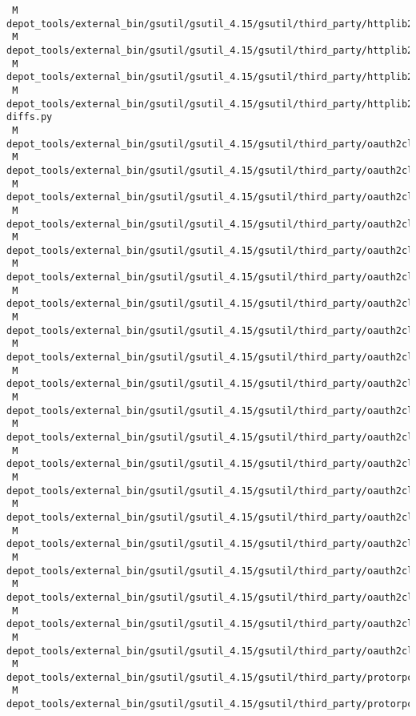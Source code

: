\documentclass{article}
\begin{document}
\begin{verbatim}
 M depot_tools/external_bin/gsutil/gsutil_4.15/gsutil/third_party/httplib2/python2/httplib2test_appengine.py
 M depot_tools/external_bin/gsutil/gsutil_4.15/gsutil/third_party/httplib2/python3/httplib2/__init__.py
 M depot_tools/external_bin/gsutil/gsutil_4.15/gsutil/third_party/httplib2/python3/httplib2test.py
 M depot_tools/external_bin/gsutil/gsutil_4.15/gsutil/third_party/httplib2/upload-diffs.py
 M depot_tools/external_bin/gsutil/gsutil_4.15/gsutil/third_party/oauth2client/docs/conf.py
 M depot_tools/external_bin/gsutil/gsutil_4.15/gsutil/third_party/oauth2client/oauth2client/client.py
 M depot_tools/external_bin/gsutil/gsutil_4.15/gsutil/third_party/oauth2client/oauth2client/crypt.py
 M depot_tools/external_bin/gsutil/gsutil_4.15/gsutil/third_party/oauth2client/oauth2client/django_orm.py
 M depot_tools/external_bin/gsutil/gsutil_4.15/gsutil/third_party/oauth2client/oauth2client/locked_file.py
 M depot_tools/external_bin/gsutil/gsutil_4.15/gsutil/third_party/oauth2client/oauth2client/multistore_file.py
 M depot_tools/external_bin/gsutil/gsutil_4.15/gsutil/third_party/oauth2client/oauth2client/old_run.py
 M depot_tools/external_bin/gsutil/gsutil_4.15/gsutil/third_party/oauth2client/oauth2client/tools.py
 M depot_tools/external_bin/gsutil/gsutil_4.15/gsutil/third_party/oauth2client/samples/call_compute_service.py
 M depot_tools/external_bin/gsutil/gsutil_4.15/gsutil/third_party/oauth2client/samples/oauth2_for_devices.py
 M depot_tools/external_bin/gsutil/gsutil_4.15/gsutil/third_party/oauth2client/scripts/fetch_gae_sdk.py
 M depot_tools/external_bin/gsutil/gsutil_4.15/gsutil/third_party/oauth2client/setup.py
 M depot_tools/external_bin/gsutil/gsutil_4.15/gsutil/third_party/oauth2client/tests/test_appengine.py
 M depot_tools/external_bin/gsutil/gsutil_4.15/gsutil/third_party/oauth2client/tests/test_crypt.py
 M depot_tools/external_bin/gsutil/gsutil_4.15/gsutil/third_party/oauth2client/tests/test_devshell.py
 M depot_tools/external_bin/gsutil/gsutil_4.15/gsutil/third_party/oauth2client/tests/test_django_orm.py
 M depot_tools/external_bin/gsutil/gsutil_4.15/gsutil/third_party/oauth2client/tests/test_file.py
 M depot_tools/external_bin/gsutil/gsutil_4.15/gsutil/third_party/oauth2client/tests/test_gce.py
 M depot_tools/external_bin/gsutil/gsutil_4.15/gsutil/third_party/oauth2client/tests/test_keyring.py
 M depot_tools/external_bin/gsutil/gsutil_4.15/gsutil/third_party/oauth2client/tests/test_oauth2client.py
 M depot_tools/external_bin/gsutil/gsutil_4.15/gsutil/third_party/protorpc/demos/appstats/protorpc_appstats/__init__.py
 M depot_tools/external_bin/gsutil/gsutil_4.15/gsutil/third_party/protorpc/demos/quotas/backend/quotas/main.py

\end{verbatim}
\end{document}
